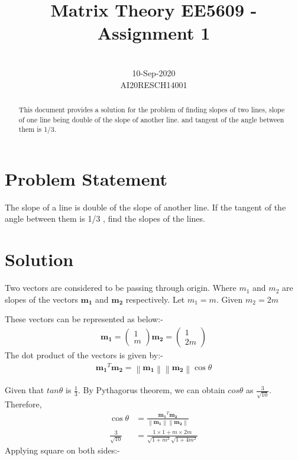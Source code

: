\documentclass[conference]{IEEEtran}
\let\vec\mathbf
\newcommand{\myvec}[1]{\ensuremath{\begin{pmatrix}#1\end{pmatrix}}}
\newcommand{\norm}[1]{\left\lVert#1\right\rVert}
\begin{document}
\title{Matrix Theory EE5609 - Assignment 1\\ 
}

\author{
 \\
10-Sep-2020\\
AI20RESCH14001\\
 }

\maketitle

\begin{abstract}
This document provides a solution for the problem of finding slopes of two lines,  slope of one line being double of the slope of another line. and tangent of the angle between them is 1/3.
\end{abstract}

\section{Problem Statement}
The slope of a line is double of the slope of another line. If the tangent of the angle between them is 1/3 , find the slopes of the lines.

\section{Solution}
Two vectors are considered to be passing through origin. Where  $m_{1}$   and  $ m_{2}$ are slopes of the vectors $\vec{m_{1}}$   and    $\vec{m_{2}}$ respectively.
Let  $m_{1} = m$. Given  $m_{2} = 2m$

These vectors can be represented as below:-
\begin{align}
\vec{m_{1}} =\myvec{ 1 \\m }
\vec{m_{2}} =\myvec{1\\2m}
 \end{align}
The dot product of the vectors is given by:-
\begin{align}
 \vec{m_{1}} ^T  \vec{m_{2}} = \norm{  \vec{ m_{1}}}\norm{  \vec{m_{2}}}  \cos \theta
\end{align}

Given that $tan \theta$ is $\frac{1}{3}$. By Pythagorus theorem, we can obtain $cos \theta$ as $\frac{3}{\sqrt{10}}$.
Therefore,
\begin{align}
\cos \theta &= \frac{\vec{m_{1}}^T  \vec{m_{2}}}{\vec{\norm{ m_{1}}} \norm{ \vec{m_{2}}}}\\
\frac{3}{\sqrt{10}} &=  \frac{1 \times 1 + {m \times 2m}}{{\sqrt{1 + m^2}\sqrt{1 +4 m^2}}}
\end{align}
Applying square on both sides:-
\end{document}

